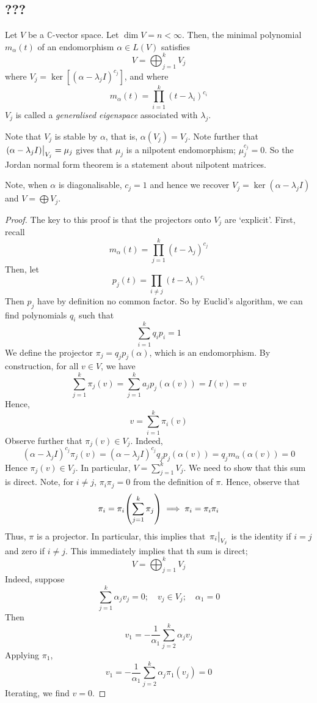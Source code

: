 \subsection{???}
\begin{theorem}
	Let \( V \) be a \( \mathbb C \)-vector space.
	Let \( \dim V = n < \infty \).
	Then, the minimal polynomial \( m_\alpha(t) \) of an endomorphism \( \alpha \in L(V) \) satisfies
	\[
		V = \bigoplus_{j=1}^k V_j
	\]
	where \( V_j = \ker[(\alpha - \lambda_j I)^{c_j}] \), and where
	\[
		m_\alpha(t) = \prod_{i=1}^k (t - \lambda_i)^{c_i}
	\]
	\( V_j \) is called a \textit{generalised eigenspace} associated with \( \lambda_j \).
\end{theorem}
\begin{remark}
	Note that \( V_j \) is stable by \( \alpha \), that is, \( \alpha(V_j) = V_j \).
	Note further that \( \eval{(\alpha - \lambda_j I)}_{V_j} = \mu_j \) gives that \( \mu_j \) is a nilpotent endomorphism; \( \mu_j^{c_j} = 0 \).
	So the Jordan normal form theorem is a statement about nilpotent matrices.

	Note, when \( \alpha \) is diagonalisable, \( c_j = 1 \) and hence we recover \( V_j = \ker(\alpha - \lambda_j I) \) and \( V = \bigoplus V_j \).
\end{remark}
\begin{proof}
	The key to this proof is that the projectors onto \( V_j \) are `explicit'.
	First, recall
	\[
		m_\alpha(t) = \prod_{j=1}^k (t-\lambda_j)^{c_j}
	\]
	Then, let
	\[
		p_j(t) = \prod_{i \neq j} (t - \lambda_i)^{c_i}
	\]
	Then \( p_j \) have by definition no common factor.
	So by Euclid's algorithm, we can find polynomials \( q_i \) such that
	\[
		\sum_{i=1}^k q_i p_i = 1
	\]
	We define the projector \( \pi_j = q_j p_j(\alpha) \), which is an endomorphism.
	By construction, for all \( v \in V \), we have
	\[
		\sum_{j=1}^k \pi_j(v) = \sum_{j=1}^k a_j p_j(\alpha(v)) = I(v) = v
	\]
	Hence,
	\[
		v = \sum_{i=1}^k \pi_i(v)
	\]
	Observe further that \( \pi_j(v) \in V_j \).
	Indeed,
	\[
		(\alpha - \lambda_j I)^{c_j} \pi_j(v) = (\alpha - \lambda_j I)^{c_j} q_j p_j(\alpha(v)) = q_j m_\alpha (\alpha(v)) = 0
	\]
	Hence \( \pi_j(v) \in V_j \).
	In particular, \( V = \sum_{j=1}^k V_j \).
	We need to show that this sum is direct.
	Note, for \( i \neq j \), \( \pi_i \pi_j = 0 \) from the definition of \( \pi \).
	Hence, observe that
	\[
		\pi_i = \pi_i \qty(\sum_{j=1}^k \pi_j) \implies \pi_i = \pi_i \pi_i
	\]
	Thus, \( \pi \) is a projector.
	In particular, this implies that \( \eval{\pi_i}_{V_j} \) is the identity if \( i = j \) and zero if \( i \neq j \).
	This immediately implies that th sum is direct;
	\[
		V = \bigoplus_{j=1}^k V_j
	\]
	Indeed, suppose
	\[
		\sum_{j=1}^k \alpha_j v_j = 0;\quad v_j \in V_j;\quad \alpha_1 = 0
	\]
	Then
	\[
		v_1 = -\frac{1}{\alpha_1} \sum_{j=2}^k \alpha_j v_j
	\]
	Applying \( \pi_1 \),
	\[
		v_1 = -\frac{1}{\alpha_1} \sum_{j=2}^k \alpha_j \pi_1(v_j) = 0
	\]
	Iterating, we find \( v = 0 \).
\end{proof}
